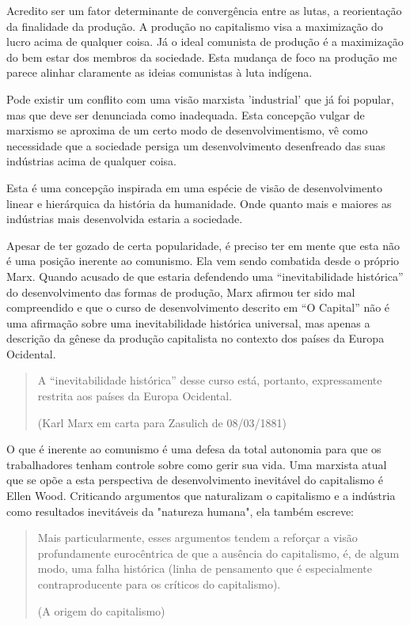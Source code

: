 Acredito ser um fator determinante de convergência entre as lutas, a reorientação da finalidade da produção. A produção no capitalismo visa a maximização do lucro acima de qualquer coisa. Já o ideal comunista de produção é a maximização do bem estar dos membros da sociedade. Esta mudança de foco na produção me parece alinhar claramente as ideias comunistas à luta indígena.

Pode existir um conflito com uma visão marxista 'industrial' que já foi popular, mas que deve ser denunciada como inadequada. Esta concepção vulgar de marxismo se aproxima de um certo modo de desenvolvimentismo, vê como necessidade que a sociedade persiga um desenvolvimento desenfreado das suas indústrias acima de qualquer coisa.

Esta é uma concepção inspirada em uma espécie de visão de desenvolvimento linear e hierárquica da história da humanidade. Onde quanto mais e maiores as indústrias mais desenvolvida estaria a sociedade.

Apesar de ter gozado de certa popularidade, é preciso ter em mente que esta não é uma posição inerente ao comunismo. Ela vem sendo combatida desde o próprio Marx. Quando acusado de que estaria defendendo uma “inevitabilidade histórica” do desenvolvimento das formas de produção, Marx afirmou ter sido mal compreendido e que o curso de desenvolvimento descrito em “O Capital” não é uma afirmação sobre uma inevitabilidade histórica universal, mas apenas a descrição da gênese da produção capitalista no contexto dos países da Europa Ocidental.

\begin{quote}
A “inevitabilidade histórica” desse curso está, portanto, expressamente restrita aos países da Europa Ocidental.

(Karl Marx em carta para Zasulich de 08/03/1881)
\end{quote}

O que é inerente ao comunismo é uma defesa da total autonomia para que os trabalhadores tenham controle sobre como gerir sua vida. Uma marxista atual que se opõe a esta perspectiva de desenvolvimento inevitável do capitalismo é Ellen Wood. Criticando argumentos que naturalizam o capitalismo e a indústria como resultados inevitáveis da "natureza humana", ela também escreve:

\begin{quote}
Mais particularmente, esses argumentos tendem a reforçar a visão profundamente eurocêntrica de que a ausência do capitalismo, é, de algum modo, uma falha histórica (linha de pensamento que é especialmente contraproducente para os críticos do capitalismo).

(A origem do capitalismo)
\end{quote}

